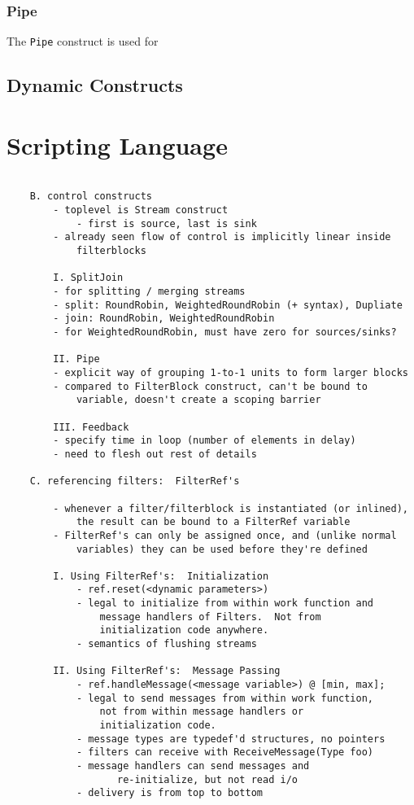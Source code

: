 \documentclass[draft]{article}
\begin{document}
\subsubsection{Pipe}

The {\tt Pipe} construct is used for 

\subsection{Dynamic Constructs}
\protect\label{sec:dynamic}

\section{Scripting Language}
\label{sec:script}

\begin{verbatim}

	B. control constructs
		- toplevel is Stream construct
			- first is source, last is sink
		- already seen flow of control is implicitly linear inside
			filterblocks
	
		I. SplitJoin
		- for splitting / merging streams
		- split: RoundRobin, WeightedRoundRobin (+ syntax), Dupliate
		- join: RoundRobin, WeightedRoundRobin
		- for WeightedRoundRobin, must have zero for sources/sinks?

		II. Pipe
		- explicit way of grouping 1-to-1 units to form larger blocks
		- compared to FilterBlock construct, can't be bound to 
			variable, doesn't create a scoping barrier

		III. Feedback
		- specify time in loop (number of elements in delay)
		- need to flesh out rest of details

	C. referencing filters:  FilterRef's

		- whenever a filter/filterblock is instantiated (or inlined),
			the result can be bound to a FilterRef variable
		- FilterRef's can only be assigned once, and (unlike normal
			variables) they can be used before they're defined

		I. Using FilterRef's:  Initialization
			- ref.reset(<dynamic parameters>)
			- legal to initialize from within work function and
				message handlers of Filters.  Not from 
				initialization code anywhere.
			- semantics of flushing streams

		II. Using FilterRef's:  Message Passing
			- ref.handleMessage(<message variable>) @ [min, max];
			- legal to send messages from within work function, 
				not from within message handlers or
				initialization code.
			- message types are typedef'd structures, no pointers
			- filters can receive with ReceiveMessage(Type foo)
			- message handlers can send messages and
				   re-initialize, but not read i/o
			- delivery is from top to bottom


\end{verbatim}
\end{document}

